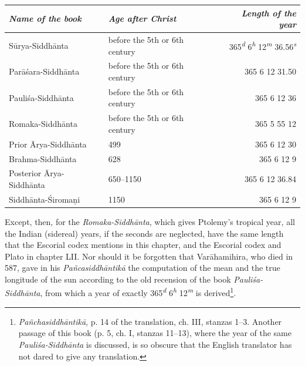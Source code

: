 \documentclass[11pt]{article}
\newcommand{\Pg}[1]{\marginpar{\footnotesize\color{gray}#1}}
\begin{document}
\begin{center}\small\begin{tabular}{llr}
\emph{Name of the book} & \emph{Age after Christ} & \emph{Length of the year} \\
\midrule
Sūrya-Siddhānta\footnotemark{} & before the 5th or 6th century & 365\textsuperscript{\itshape d} 6\textsuperscript{\itshape h} 12\textsuperscript{\itshape m} 36.56\textsuperscript{\itshape s} \\
Parāśara-Siddhānta & before the 5th or 6th century & 365 6 12 31.50 \\
Pauliśa-Siddhānta & before the 5th or 6th century & 365 6 12 36 \\
Romaka-Siddhānta & before the 5th or 6th century & 365 5 55 12 \\
Prior Ārya-Siddhānta & 499 & 365 6 12 30 \\
Brahma-Siddhānta & 628 & 365 6 12 9 \\
Posterior Ārya-Siddhānta & 650–1150 & 365 6 12 36.84 \\
Siddhānta-Śiromaṇi & 1150 & 365 6 12 9 \\
\end{tabular}\end{center}
\addtocounter{footnote}{-1}
\par \Pg{I 207}Except, then, for the \emph{Romaka-Siddhānta}, which gives Ptolemy's tropical year, all the Indian (sidereal) years, if the seconds are neglected, have the same length that the Escorial codex mentions in this chapter, and the Escorial codex and Plato in chapter LII. Nor should it be forgotten that Varāhamihira, who died in 587, gave in his \emph{Pañcasiddhāntikā} the computation of the mean and the true longitude of the sun according to the old recension of the book \emph{Pauliśa-Siddhānta}, from which a year of exactly 365\textsuperscript{\itshape d} 6\textsuperscript{\itshape h} 12\textsuperscript{\itshape m} is derived\footnote{\emph{Pañchasiddhāntikā}, p. 14 of the translation, ch. III, stanzas 1–3. Another passage of this book (p. 5, ch. I, stanzas 11–13), where the year of the same \emph{Pauliśa-Siddhānta} is discussed, is so obscure that the English translator has not dared to give any translation.}.\par
\end{document}
